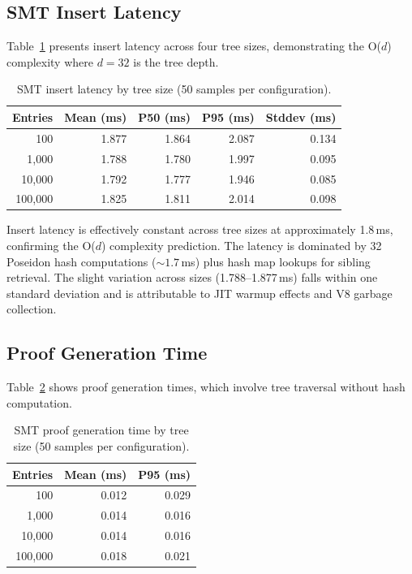 \subsection{SMT Insert Latency}

Table~\ref{tab:insert-latency} presents insert latency across four tree sizes, demonstrating the O($d$) complexity where $d = 32$ is the tree depth.

\begin{table}[htbp]
\centering
\caption{SMT insert latency by tree size (50 samples per configuration).}
\label{tab:insert-latency}
\begin{tabular}{rrrrr}
\hline
\textbf{Entries} & \textbf{Mean (ms)} & \textbf{P50 (ms)} & \textbf{P95 (ms)} & \textbf{Stddev (ms)} \\
\hline
100 & 1.877 & 1.864 & 2.087 & 0.134 \\
1{,}000 & 1.788 & 1.780 & 1.997 & 0.095 \\
10{,}000 & 1.792 & 1.777 & 1.946 & 0.085 \\
100{,}000 & 1.825 & 1.811 & 2.014 & 0.098 \\
\hline
\end{tabular}
\end{table}

Insert latency is effectively constant across tree sizes at approximately 1.8\,ms, confirming the O($d$) complexity prediction. The latency is dominated by 32 Poseidon hash computations (${\sim}1.7$\,ms) plus hash map lookups for sibling retrieval. The slight variation across sizes (1.788--1.877\,ms) falls within one standard deviation and is attributable to JIT warmup effects and V8 garbage collection.

\subsection{Proof Generation Time}

Table~\ref{tab:proof-gen} shows proof generation times, which involve tree traversal without hash computation.

\begin{table}[htbp]
\centering
\caption{SMT proof generation time by tree size (50 samples per configuration).}
\label{tab:proof-gen}
\begin{tabular}{rrr}
\hline
\textbf{Entries} & \textbf{Mean (ms)} & \textbf{P95 (ms)} \\
\hline
100 & 0.012 & 0.029 \\
1{,}000 & 0.014 & 0.016 \\
10{,}000 & 0.014 & 0.016 \\
100{,}000 & 0.018 & 0.021 \\
\hline
\end{tabular}
\end{table}

